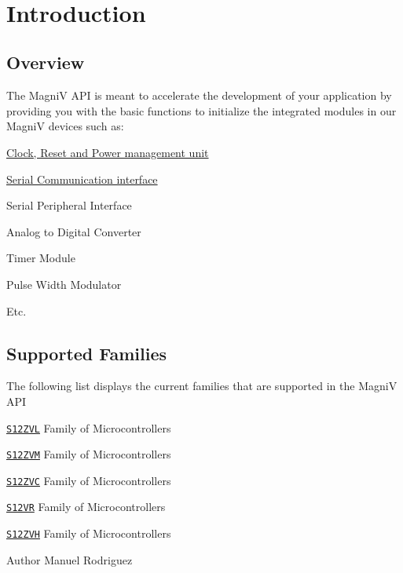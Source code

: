 ~\newline
 \section*{Introduction}


\begin{DoxyItemize}
\item \subsection*{Overview}



The Magni\+V A\+P\+I is meant to accelerate the development of your application by providing you with the basic functions to initialize the integrated modules in our Magni\+V devices such as\+: 
\begin{DoxyItemize}
\item \hyperlink{group___c_p_m_u}{Clock, Reset and Power management unit}  
\item \hyperlink{group___s_c_i}{Serial Communication interface}  
\item Serial Peripheral Interface 
\item Analog to Digital Converter 
\item Timer Module 
\item Pulse Width Modulator 
\item Etc. 
\end{DoxyItemize}



 
\item \subsection*{Supported Families}



The following list displays the current families that are supported in the Magni\+V A\+P\+I 
\begin{DoxyItemize}
\item \href{http://www.freescale.com/s12zvl}{\tt S12\+Z\+V\+L} Family of Microcontrollers 
\item \href{http://www.freescale.com/s12zvm}{\tt S12\+Z\+V\+M} Family of Microcontrollers 
\item \href{http://www.freescale.com/s12zvc}{\tt S12\+Z\+V\+C} Family of Microcontrollers 
\item \href{http://www.freescale.com/s12vr}{\tt S12\+V\+R} Family of Microcontrollers 
\item \href{http://www.freescale.com/s12zvh}{\tt S12\+Z\+V\+H} Family of Microcontrollers 
\end{DoxyItemize}


\end{DoxyItemize}

\begin{DoxyAuthor}{Author}
Manuel Rodriguez 
\end{DoxyAuthor}
